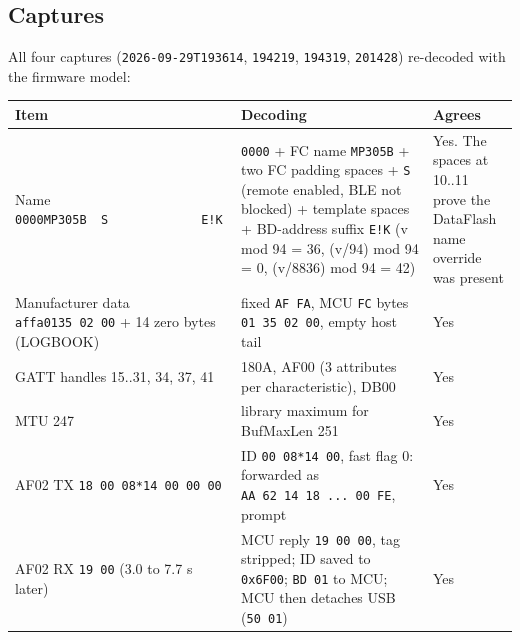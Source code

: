 \subsection{Captures}\label{captures}

All four captures (\texttt{2026-09-29T193614}, \texttt{194219},
\texttt{194319}, \texttt{201428}) re-decoded with the firmware model:

{\def\LTcaptype{none} %
\begin{longtable}[]{@{}
  >{\raggedright\arraybackslash}p{}
  >{\raggedright\arraybackslash}p{}
  >{\raggedright\arraybackslash}p{}@{}}
\toprule\noalign{}
\begin{minipage}[b]{\linewidth}\raggedright
Item
\end{minipage} & \begin{minipage}[b]{\linewidth}\raggedright
Decoding
\end{minipage} & \begin{minipage}[b]{\linewidth}\raggedright
Agrees
\end{minipage} \\
\midrule\noalign{}
\endhead
\bottomrule\noalign{}
\endlastfoot
Name \texttt{0000MP305B\ \ S\ \ \ \ \ \ \ \ \ \ \ \ \ E!K} &
\texttt{0000} + FC name \texttt{MP305B} + two FC padding spaces +
\texttt{S} (remote enabled, BLE not blocked) + template spaces +
BD-address suffix \texttt{E!K} (v mod 94 = 36, (v/94) mod 94 = 0,
(v/8836) mod 94 = 42) & Yes. The spaces at 10..11 prove the DataFlash
name override was present \\
Manufacturer data \texttt{affa0135\ 02\ 00} + 14 zero bytes (LOGBOOK) &
fixed \texttt{AF\ FA}, MCU \texttt{FC} bytes \texttt{01\ 35\ 02\ 00},
empty host tail & Yes \\
GATT handles 15..31, 34, 37, 41 & 180A, AF00 (3 attributes per
characteristic), DB00 & Yes \\
MTU 247 & library maximum for BufMaxLen 251 & Yes \\
AF02 TX \texttt{18\ 00\ 08*14\ 00\ 00\ 00} & ID \texttt{00\ 08*14\ 00},
fast flag 0: forwarded as \texttt{AA\ 62\ 14\ 18\ ...\ 00\ FE}, prompt &
Yes \\
AF02 RX \texttt{19\ 00} (3.0 to 7.7 s later) & MCU reply
\texttt{19\ 00\ 00}, tag stripped; ID saved to \texttt{0x6F00};
\texttt{BD\ 01} to MCU; MCU then detaches USB (\texttt{50\ 01}) & Yes \\

\end{longtable}}
